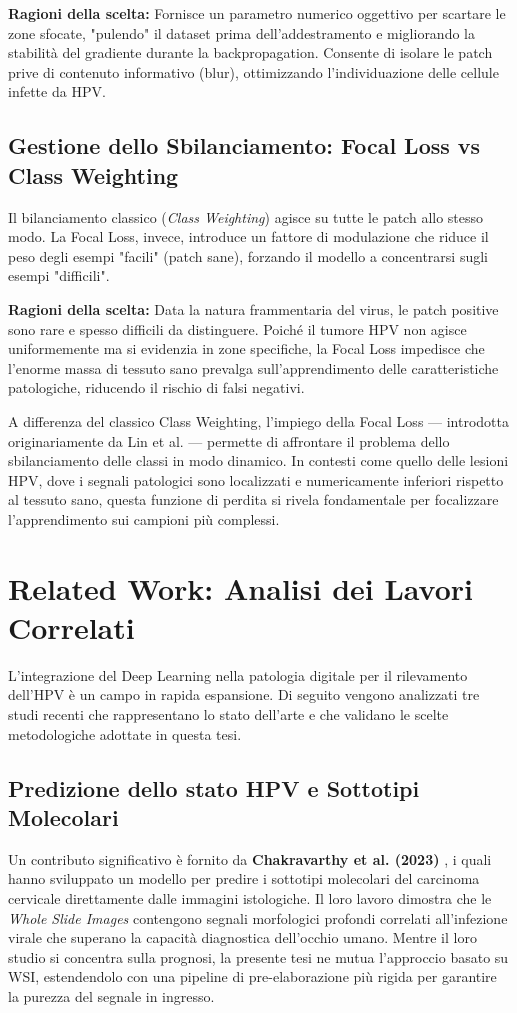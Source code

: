 \textbf{Ragioni della scelta:} Fornisce un parametro numerico oggettivo per scartare le zone sfocate, "pulendo" il dataset prima dell'addestramento e migliorando la stabilità del gradiente durante la backpropagation. Consente di isolare le patch prive di contenuto informativo (blur), ottimizzando l'individuazione delle cellule infette da HPV.

\subsection{Gestione dello Sbilanciamento: Focal Loss vs Class Weighting} 
Il bilanciamento classico (\textit{Class Weighting}) agisce su tutte le patch allo stesso modo. La Focal Loss, invece, introduce un fattore di modulazione che riduce il peso degli esempi "facili" (patch sane), forzando il modello a concentrarsi sugli esempi "difficili".

\textbf{Ragioni della scelta:} Data la natura frammentaria del virus, le patch positive sono rare e spesso difficili da distinguere. Poiché il tumore HPV non agisce uniformemente ma si evidenzia in zone specifiche, la Focal Loss impedisce che l'enorme massa di tessuto sano prevalga sull'apprendimento delle caratteristiche patologiche, riducendo il rischio di falsi negativi.

A differenza del classico Class Weighting, l'impiego della Focal Loss — introdotta originariamente da Lin et al. \cite{lin2017focal} — permette di affrontare il problema dello sbilanciamento delle classi in modo dinamico. In contesti come quello delle lesioni HPV, dove i segnali patologici sono localizzati e numericamente inferiori rispetto al tessuto sano, questa funzione di perdita si rivela fondamentale per focalizzare l'apprendimento sui campioni più complessi.


\section{Related Work: Analisi dei Lavori Correlati}
L'integrazione del Deep Learning nella patologia digitale per il rilevamento dell'HPV è un campo in rapida espansione. Di seguito vengono analizzati tre studi recenti che rappresentano lo stato dell'arte e che validano le scelte metodologiche adottate in questa tesi.

\subsection{Predizione dello stato HPV e Sottotipi Molecolari}
Un contributo significativo è fornito da \textbf{Chakravarthy et al. (2023)} \cite{chakravarthy2023deep}, i quali hanno sviluppato un modello per predire i sottotipi molecolari del carcinoma cervicale direttamente dalle immagini istologiche. Il loro lavoro dimostra che le \textit{Whole Slide Images} contengono segnali morfologici profondi correlati all'infezione virale che superano la capacità diagnostica dell'occhio umano. Mentre il loro studio si concentra sulla prognosi, la presente tesi ne mutua l'approccio basato su WSI, estendendolo con una pipeline di pre-elaborazione più rigida per garantire la purezza del segnale in ingresso.

